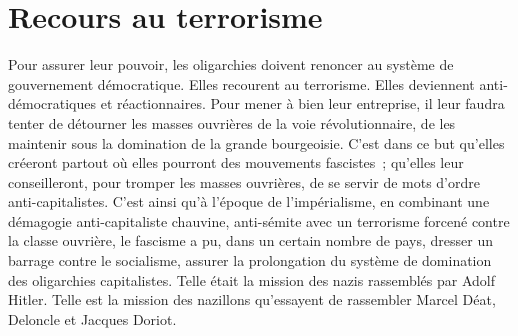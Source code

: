 \documentclass[french,twoside]{book} %
\begin{document}
\section[Recours au terrorisme]{Recours au terrorisme}
\noindent Pour assurer leur pouvoir, les oligarchies doivent renoncer au système de gouvernement démocratique. Elles recourent au terrorisme. Elles deviennent anti-démocratiques et réactionnaires. Pour mener à bien leur entreprise, il leur faudra tenter de détourner les masses ouvrières de la voie révolutionnaire, de les maintenir sous la domination de la grande bourgeoisie. C’est dans ce but qu’elles créeront partout où elles pourront des mouvements fascistes ; qu’elles leur conseilleront, pour tromper les masses ouvrières, de se servir de mots d’ordre anti-capitalistes. C’est ainsi qu’à l’époque de l’impérialisme, en combinant une démagogie anti-capitaliste chauvine, anti-sémite avec un terrorisme forcené contre la classe ouvrière, le fascisme a pu, dans un certain nombre de pays, dresser un barrage contre le socialisme, assurer la prolongation du système de domination des oligarchies capitalistes. Telle était la mission des nazis rassemblés par Adolf Hitler. Telle est la mission des nazillons qu’essayent de rassembler Marcel Déat, Deloncle et Jacques Doriot.
\end{document}
